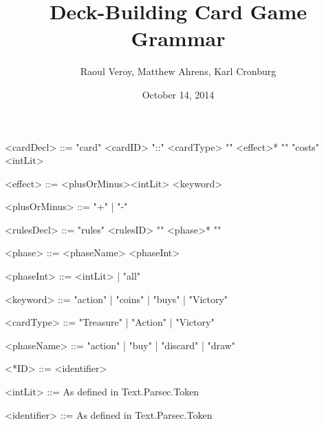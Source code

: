\documentclass{article}
\title{Deck-Building Card Game Grammar}
\author{Raoul Veroy, Matthew Ahrens, Karl Cronburg}
\date{October 14, 2014}
\begin{document}
\maketitle
\thispagestyle{empty}

\begin{grammar}

<cardDecl>    ::= "card" <cardID> "::" <cardType> "{" <effect>* "}" "costs" <intLit>

<effect>      ::= <plusOrMinus><intLit> <keyword>

<plusOrMinus> ::= "+" | "-"


<rulesDecl> ::= "rules" <rulesID> "{" <phase>* "}"

<phase>     ::= <phaseName> <phaseInt>

<phaseInt>  ::= <intLit> | "all"

<keyword>     ::= "action"   | "coins"  | "buys"    | "Victory"

<cardType>    ::= "Treasure" | "Action" | "Victory"

<phaseName>   ::= "action"   | "buy"    | "discard" | "draw"

<*ID>         ::= <identifier>

<intLit>      ::= As defined in Text.Parsec.Token

<identifier>  ::= As defined in Text.Parsec.Token

%
%
%
%
\end{grammar}
\end{document}
